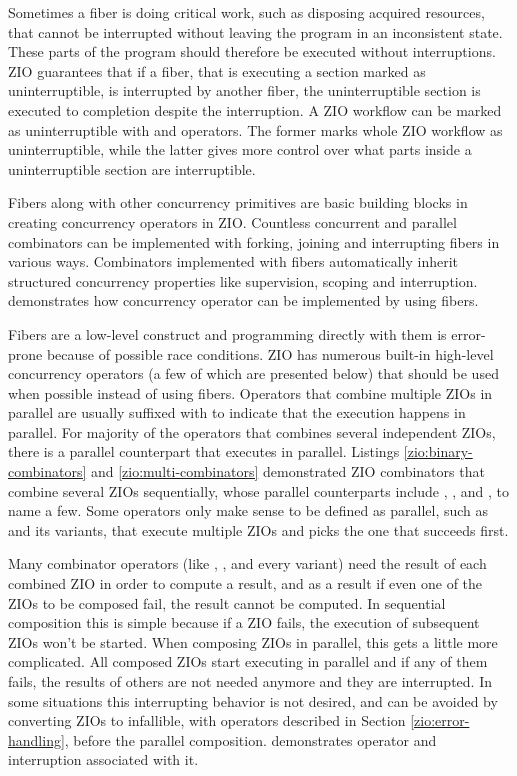 Sometimes a fiber is doing critical work, such as disposing acquired resources, that cannot be interrupted without leaving the program in an inconsistent state. These parts of the program should therefore be executed without interruptions. ZIO guarantees that if a fiber, that is executing a section marked as uninterruptible, is interrupted by another fiber, the uninterruptible section is executed to completion despite the interruption. A ZIO workflow can be marked as uninterruptible with  and  operators. The former marks whole ZIO workflow as uninterruptible, while the latter gives more control over what parts inside a uninterruptible section are interruptible.

Fibers along with other concurrency primitives are basic building blocks in creating concurrency operators in ZIO. Countless concurrent and parallel combinators can be implemented with forking, joining and interrupting fibers in various ways. Combinators implemented with fibers automatically inherit structured concurrency properties like supervision, scoping and interruption.  demonstrates how  concurrency operator can be implemented by using fibers.



Fibers are a low-level construct and programming directly with them is error-prone because of possible race conditions. ZIO has numerous built-in high-level concurrency operators (a few of which are presented below) that should be used when possible instead of using fibers. Operators that combine multiple ZIOs in parallel are usually suffixed with  to indicate that the execution happens in parallel. For majority of the operators that combines several independent ZIOs, there is a parallel counterpart that executes in parallel. Listings \ref{zio:binary-combinators} and \ref{zio:multi-combinators} demonstrated ZIO combinators that combine several ZIOs sequentially, whose parallel counterparts include , , and , to name a few. Some operators only make sense to be defined as parallel, such as  and its variants, that execute multiple ZIOs and picks the one that succeeds first.

Many combinator operators (like , , and every  variant) need the result of each combined ZIO in order to compute a result, and as a result if even one of the ZIOs to be composed fail, the result cannot be computed. In sequential composition this is simple because if a ZIO fails, the execution of subsequent ZIOs won't be started. When composing ZIOs in parallel, this gets a little more complicated. All composed ZIOs start executing in parallel and if any of them fails, the results of others are not needed anymore and they are interrupted. In some situations this interrupting behavior is not desired, and can be avoided by converting ZIOs to infallible, with operators described in Section \ref{zio:error-handling}, before the parallel composition.  demonstrates  operator and interruption associated with it.

